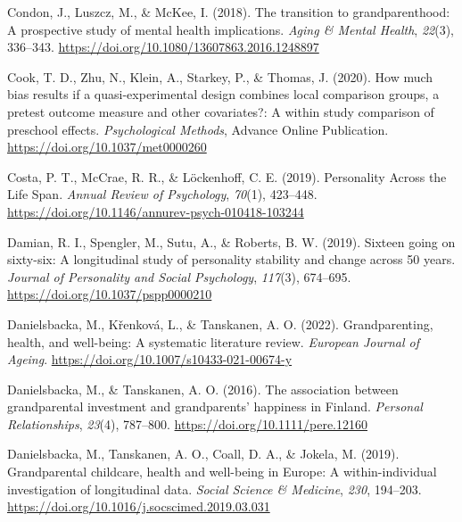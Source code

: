 \documentclass[
  english,
  man,floatsintext]{apa7}
\begin{document}
\leavevmode\hypertarget{ref-condonTransitionGrandparenthoodProspective2018}{}%
Condon, J., Luszcz, M., \& McKee, I. (2018). The transition to grandparenthood: A prospective study of mental health implications. \emph{Aging \& Mental Health}, \emph{22}(3), 336--343. \url{https://doi.org/10.1080/13607863.2016.1248897}

\leavevmode\hypertarget{ref-cookHowMuchBias2020}{}%
Cook, T. D., Zhu, N., Klein, A., Starkey, P., \& Thomas, J. (2020). How much bias results if a quasi-experimental design combines local comparison groups, a pretest outcome measure and other covariates?: A within study comparison of preschool effects. \emph{Psychological Methods}, Advance Online Publication. \url{https://doi.org/10.1037/met0000260}

\leavevmode\hypertarget{ref-costaPersonalityLifeSpan2019}{}%
Costa, P. T., McCrae, R. R., \& Löckenhoff, C. E. (2019). Personality Across the Life Span. \emph{Annual Review of Psychology}, \emph{70}(1), 423--448. \url{https://doi.org/10.1146/annurev-psych-010418-103244}

\leavevmode\hypertarget{ref-damianSixteenGoingSixtysix2019}{}%
Damian, R. I., Spengler, M., Sutu, A., \& Roberts, B. W. (2019). Sixteen going on sixty-six: A longitudinal study of personality stability and change across 50 years. \emph{Journal of Personality and Social Psychology}, \emph{117}(3), 674--695. \url{https://doi.org/10.1037/pspp0000210}

\leavevmode\hypertarget{ref-danielsbackaGrandparentingHealthWellbeing2022}{}%
Danielsbacka, M., Křenková, L., \& Tanskanen, A. O. (2022). Grandparenting, health, and well-being: A systematic literature review. \emph{European Journal of Ageing}. \url{https://doi.org/10.1007/s10433-021-00674-y}

\leavevmode\hypertarget{ref-danielsbackaAssociationGrandparentalInvestment2016}{}%
Danielsbacka, M., \& Tanskanen, A. O. (2016). The association between grandparental investment and grandparents' happiness in Finland. \emph{Personal Relationships}, \emph{23}(4), 787--800. \url{https://doi.org/10.1111/pere.12160}

\leavevmode\hypertarget{ref-danielsbackaGrandparentalChildcareHealth2019}{}%
Danielsbacka, M., Tanskanen, A. O., Coall, D. A., \& Jokela, M. (2019). Grandparental childcare, health and well-being in Europe: A within-individual investigation of longitudinal data. \emph{Social Science \& Medicine}, \emph{230}, 194--203. \url{https://doi.org/10.1016/j.socscimed.2019.03.031}
\end{document}
